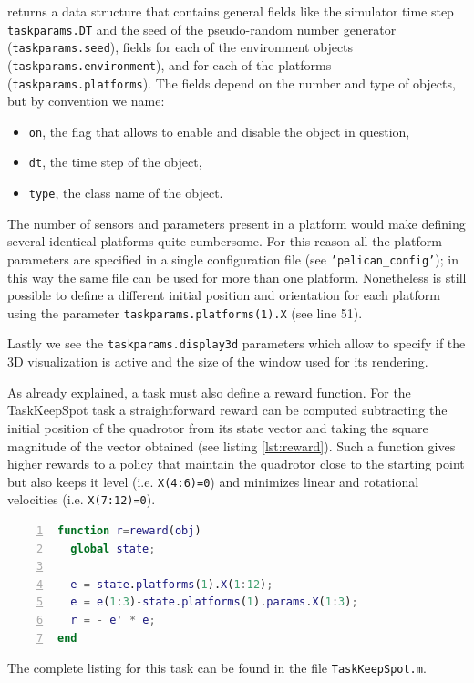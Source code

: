 \documentclass[a4paper,11pt]{report}
\begin{document}
returns a data structure that contains general fields like the simulator time step \texttt{taskparams.DT} and the seed of the pseudo-random number generator (\texttt{taskparams.seed}), fields for each of the environment objects (\texttt{taskparams.environment}), and for each of the platforms (\texttt{taskparams.platforms}). The fields depend on the number and type of objects, but by convention we name:
\begin{itemize}
\item \texttt{on}, the flag that allows to enable and disable the object in question,
\item \texttt{dt}, the time step of the object,
\item \texttt{type}, the class name of the object.
\end{itemize}

The number of sensors and parameters present in a platform would make defining several identical platforms quite cumbersome. For this reason all the platform parameters are specified in a single configuration file (see \texttt{'pelican\_config'}); in this way the same file can be used for more than one platform. Nonetheless is still possible to define a different initial position and orientation for each platform using the parameter \texttt{taskparams.platforms(1).X} (see line 51).

Lastly we see the \texttt{taskparams.display3d} parameters which allow to specify if the 3D visualization is active and the size of the window used for its rendering. 

As already explained, a task must also define a reward function. For the TaskKeepSpot task a straightforward reward can be computed subtracting the initial position of the quadrotor from its state vector and taking the square magnitude of the vector obtained (see listing \ref{lst:reward}). 
Such a function gives higher rewards to a policy that maintain the quadrotor close to the starting point but also keeps it level (i.e. \texttt{X(4:6)=0}) and minimizes linear and rotational velocities (i.e. \texttt{X(7:12)=0}).

\begin{lstlisting}[float=ht!bp,caption=TaskKeepSpot reward() method,language=Matlab,frame=lines,label=lst:reward,numbers=left,basicstyle=\small]
function r=reward(obj)
  global state;

  e = state.platforms(1).X(1:12);
  e = e(1:3)-state.platforms(1).params.X(1:3);
  r = - e' * e; 
end
\end{lstlisting}
The complete listing for this task can be found in the file \texttt{TaskKeepSpot.m}.  
\end{document}
